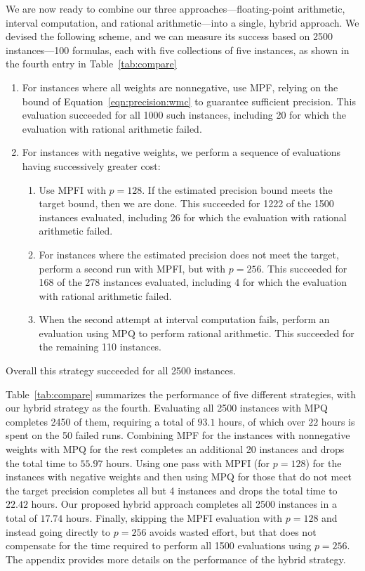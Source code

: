\documentclass[letterpaper,USenglish,cleveref, autoref, thm-restate]{lipics-v2021}
\begin{document}
We are now ready to combine our three approaches---floating-point
arithmetic, interval computation, and rational arithmetic---into a
single, hybrid approach.  We devised the following scheme, and we can
measure its success based on 2500 instances---100 formulas, each with five collections of five instances, as shown in the fourth entry in Table~\ref{tab:compare}
\begin{enumerate}
\item For instances where all weights are nonnegative, use MPF,
  relying on the bound of Equation~\ref{eqn:precision:wmc} to
  guarantee sufficient precision.  This evaluation succeeded for all 1000 such
  instances, including 20 for which the evaluation with rational arithmetic failed.
\item For instances with negative weights, we perform a sequence of evaluations having successively greater cost:
\begin{enumerate}
\item 
  Use MPFI with $p=128$.  If the estimated precision
  bound meets the target bound, then we are done.  This succeeded for
  1222 of the 1500 instances evaluated, including 26 for which the evaluation with rational arithmetic failed.
\item For instances where the estimated precision does not meet the target, perform a second run with MPFI, but with $p=256$.  This succeeded
  for 168 of the 278 instances evaluated, including 4 for which the evaluation with rational arithmetic failed.
\item When the second attempt at interval computation fails, perform
  an evaluation using MPQ to perform rational arithmetic.  This
  succeeded for the remaining 110 instances.
\end{enumerate}
\end{enumerate}
Overall this strategy succeeded for all 2500 instances.

Table~\ref{tab:compare} summarizes the performance of five different strategies, with our hybrid strategy as the fourth.
Evaluating all 2500
instances with MPQ completes
2450 of them, requiring a
total of $93.1$ hours, of which over 
$22$ hours is spent on the 50 failed runs.
Combining MPF for the instances with nonnegative weights with MPQ for the rest
completes an
additional 20 instances and drops the total time to $55.97$ hours.
Using one pass with MPFI (for $p=128$)
for the instances with negative weights and then using MPQ for those
that do not meet the target precision completes all but 4 instances
and drops the total time to $22.42$ hours.
Our proposed hybrid approach completes all 2500 instances in a total of
$17.74$ hours.
Finally, skipping the MPFI evaluation with $p=128$ and instead going directly to $p=256$ avoids
wasted effort, but that
does not
compensate for the time required to perform all 1500 evaluations using
$p=256$.  The appendix provides more
details on the performance of the hybrid strategy.
\end{document}
